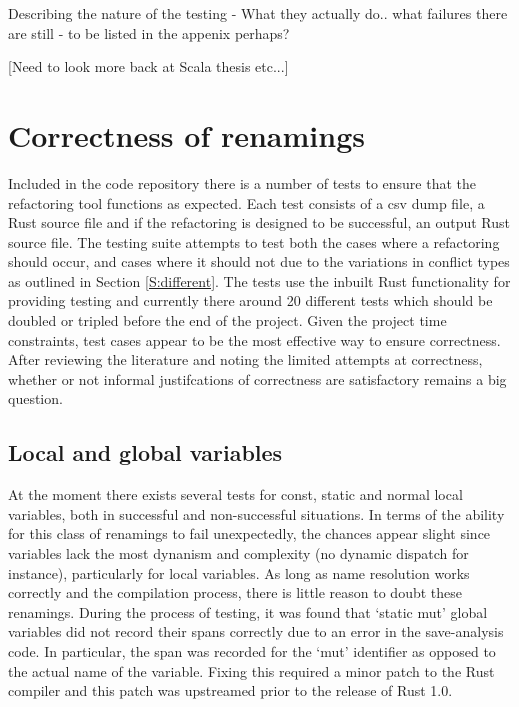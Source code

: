 Describing the nature of the testing - What they actually do.. what failures there are still - to be listed in the appenix perhaps?

[Need to look more back at Scala thesis etc...]

\section{Correctness of renamings}
Included in the code repository there is a number of tests to ensure that the refactoring tool functions as expected. Each test consists of a csv dump file, a Rust source file and if the refactoring is designed to be successful, an output Rust source file. The testing suite attempts to test both the cases where a refactoring should occur, and cases where it should not due to the variations in conflict types as outlined in Section \ref{S:different}. The tests use the inbuilt Rust functionality for providing testing and currently there around 20 different tests which should be doubled or tripled before the end of the project. Given the project time constraints, test cases appear to be the most effective way to ensure correctness. After reviewing the literature and noting the limited attempts at correctness, whether or not informal justifcations of correctness are satisfactory remains a big question.

\subsection{Local and global variables}
At the moment there exists several tests for const, static and normal local variables, both in successful and non-successful situations. In terms of the ability for this class of renamings to fail unexpectedly, the chances appear slight since variables lack the most dynanism and complexity (no dynamic dispatch for instance), particularly for local variables. As long as name resolution works correctly and the compilation process, there is little reason to doubt these renamings. During the process of testing, it was found that `static mut' global variables did not record their spans correctly due to an error in the save-analysis code. In particular, the span was recorded for the `mut' identifier as opposed to the actual name of the variable. Fixing this required a minor patch to the Rust compiler and this patch was upstreamed prior to the release of Rust 1.0.


